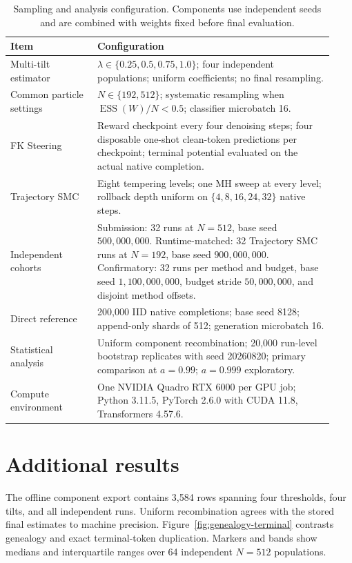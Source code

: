 \documentclass{article}
\newcommand{\ESS}{\operatorname{ESS}}
\begin{document}
\begin{table}[ht]
\caption{Sampling and analysis configuration. Components use independent
seeds and are combined with weights fixed before final evaluation.}
\label{tab:repro-smc}
\centering
\small
\begin{tabular}{p{0.25\linewidth}p{0.68\linewidth}}
\toprule
Item & Configuration \\
\midrule
Multi-tilt estimator & $\lambda\in\{0.25,0.5,0.75,1.0\}$; four independent
populations; uniform coefficients; no final resampling. \\
Common particle settings & $N\in\{192,512\}$; systematic resampling when
$\ESS(W)/N<0.5$; classifier microbatch 16. \\
FK Steering & Reward checkpoint every four denoising steps; four disposable
one-shot clean-token predictions per checkpoint; terminal potential evaluated
on the actual native completion. \\
Trajectory SMC & Eight tempering levels; one MH sweep at every level; rollback
depth uniform on $\{4,8,16,24,32\}$ native steps. \\
Independent cohorts & Submission: 32 runs at $N=512$, base seed
$500{,}000{,}000$. Runtime-matched: 32 Trajectory SMC runs at $N=192$, base seed
$900{,}000{,}000$. Confirmatory: 32 runs per method and budget, base seed
$1{,}100{,}000{,}000$, budget stride $50{,}000{,}000$, and disjoint
method offsets. \\
Direct reference & 200,000 IID native completions; base seed 8128; append-only
shards of 512; generation microbatch 16. \\
Statistical analysis & Uniform component recombination; 20,000 run-level
bootstrap replicates with seed 20260820; primary comparison at $a=0.99$;
$a=0.999$ exploratory. \\
Compute environment & One NVIDIA Quadro RTX 6000 per GPU job; Python 3.11.5,
PyTorch 2.6.0 with CUDA 11.8, Transformers 4.57.6. \\
\bottomrule
\end{tabular}
\end{table}

\FloatBarrier
\section{Additional results}

The offline component export contains 3,584 rows spanning four thresholds,
four tilts, and all independent runs. Uniform recombination agrees with the
stored final estimates to machine precision. Figure~\ref{fig:genealogy-terminal}
contrasts genealogy and exact terminal-token duplication. Markers and bands
show medians and interquartile ranges over 64 independent $N=512$ populations.
\end{document}
